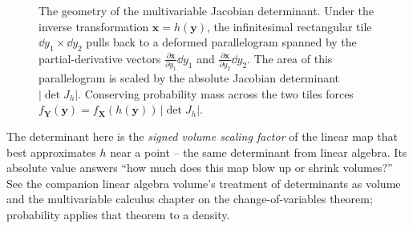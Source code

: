 \begin{figure}[H]
\caption{The geometry of the multivariable Jacobian determinant. Under the inverse transformation $\mathbf{x} = h(\mathbf{y})$, the infinitesimal rectangular tile $\dd y_1 \times \dd y_2$ pulls back to a deformed parallelogram spanned by the partial-derivative vectors $\frac{\partial \mathbf{x}}{\partial y_1}\dd y_1$ and $\frac{\partial \mathbf{x}}{\partial y_2}\dd y_2$. The area of this parallelogram is scaled by the absolute Jacobian determinant $|\det J_h|$. Conserving probability mass across the two tiles forces $f_{\mathbf Y}(\mathbf y) = f_{\mathbf X}(h(\mathbf y))\,|\det J_h|$.}
\label{ch16:fig-jacobian-tiles}
\end{figure}

\begin{connectionbox}
The determinant here is the \emph{signed volume scaling factor} of the linear map that best
approximates $h$ near a point -- the same determinant from linear algebra. Its absolute
value answers ``how much does this map blow up or shrink volumes?'' See the companion
linear algebra volume's treatment of determinants as volume and the multivariable calculus
chapter on the change-of-variables theorem; probability applies that theorem to a
density.
\end{connectionbox}

